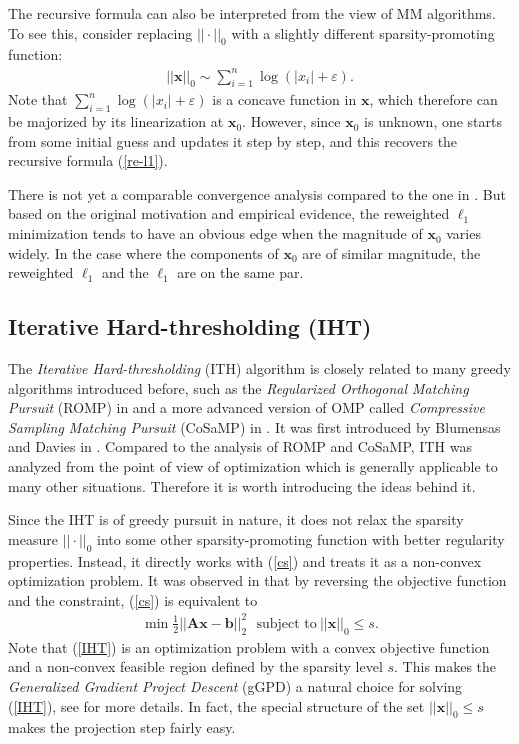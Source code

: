 \documentclass[11pt]{article}
\numberwithin{equation}{section}
\theoremstyle{plain}
\theoremstyle{definition}
\def\A{{\mathbf A}}
\def\x{{\mathbf x}}
\def\b{{\mathbf b}}
\def\e{{\varepsilon}}
\begin{document}
The recursive formula can also be interpreted from the view of MM algorithms. To see this, consider replacing $|| \cdot||_0$ with a slightly different sparsity-promoting function:
\begin{align*}
||\x||_0\sim\sum_{i=1}^n\log(|x_i|+\e). 
\end{align*}
Note that $\sum_{i=1}^n\log(|x_i|+\e)$ is a concave function in $\x$, which therefore can be majorized by its linearization at $\x_0$. However, since $\x_0$ is unknown, one starts from some initial guess and updates it step by step, and this recovers the recursive formula (\ref{re-l1}).

There is not yet a comparable convergence analysis compared to the one in \cite{daubechies2010iteratively}. But based on the original motivation and empirical evidence, the reweighted $\ell_1$ minimization tends to have an obvious edge when the magnitude of $\x_0$ varies widely. In the case where the components of $\x_0$ are of similar magnitude, the reweighted $\ell_1$ and the $\ell_1$ are on the same par.      

\subsection{Iterative Hard-thresholding (IHT)}

The \emph{Iterative Hard-thresholding} (ITH) algorithm is closely related to many greedy algorithms introduced before, such as the \emph{Regularized Orthogonal Matching Pursuit} (ROMP) in \cite{needell2009uniform}  and a more advanced version of OMP called \emph{Compressive Sampling Matching Pursuit} (CoSaMP) in \cite{needell2009cosamp}. It was first introduced by Blumensas and Davies in \cite{blumensath2009iterative}. Compared to the analysis of ROMP and CoSaMP, ITH was analyzed from the point of view of optimization which is generally applicable to many other situations. Therefore it is worth introducing the ideas behind it. 

Since the IHT is of greedy pursuit in nature, it does not relax the sparsity measure $|| \cdot||_0$ into some other sparsity-promoting function with better regularity properties. Instead, it directly works with (\ref{cs}) and treats it as a non-convex optimization problem. It was observed in \cite{blumensath2009iterative} that by reversing the objective function and the constraint, (\ref{cs}) is equivalent to 
\begin{align}
\min \frac{1}{2}||\A\x-\b||_2^2 \ \ \ \text{subject to}\ ||\x||_0\leq s.\label{IHT}
\end{align}
Note that (\ref{IHT}) is an optimization problem with a convex objective function and a non-convex feasible region defined by the sparsity level $s$. This makes the \emph{Generalized Gradient Project Descent} (gGPD) a natural choice for solving (\ref{IHT}), see \cite{jain2017non} for more details. In fact, the special structure of the set $||\x||_0\leq s$ makes the projection step fairly easy. 
\end{document}
